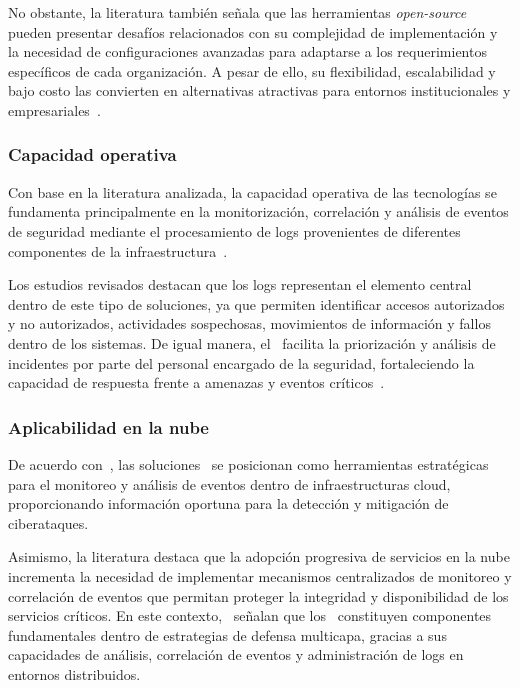 No obstante, la literatura también señala que las herramientas \SIEM \textit{open-source} pueden presentar desafíos relacionados con su 
complejidad de implementación y la necesidad de configuraciones avanzadas para adaptarse a los requerimientos específicos de cada 
organización. A pesar de ello, su flexibilidad, escalabilidad y bajo costo las convierten en alternativas atractivas para entornos 
institucionales y empresariales~\cite{hadi2024opensource}.

\subsubsection{Capacidad operativa}

Con base en la literatura analizada, la capacidad operativa de las tecnologías \SIEM se fundamenta principalmente en la monitorización, 
correlación y análisis de eventos de seguridad mediante el procesamiento de logs provenientes de diferentes componentes de la 
infraestructura~\cite{coppolino2022siem}.

Los estudios revisados destacan que los logs representan el elemento central dentro de este tipo de soluciones, ya que permiten 
identificar accesos autorizados y no autorizados, actividades sospechosas, movimientos de información y fallos dentro de los sistemas. De 
igual manera, el \SIEM\ facilita la priorización y análisis de incidentes por parte del personal encargado de la seguridad, fortaleciendo la 
capacidad de respuesta frente a amenazas y eventos críticos~\cite{coppolino2022siem}.

\subsubsection{Aplicabilidad en la nube}

De acuerdo con~\cite{coppolino2022siem}, las soluciones \SIEM\ se posicionan como herramientas estratégicas para el monitoreo y análisis de 
eventos dentro de infraestructuras cloud, proporcionando información oportuna para la detección y mitigación de ciberataques.

Asimismo, la literatura destaca que la adopción progresiva de servicios en la nube incrementa la necesidad de implementar mecanismos 
centralizados de monitoreo y correlación de eventos que permitan proteger la integridad y disponibilidad de los servicios críticos. En este 
contexto,~\cite{hadi2024opensource} señalan que los \SIEM\ constituyen componentes fundamentales dentro de estrategias de defensa multicapa, 
gracias a sus capacidades de análisis, correlación de eventos y administración de logs en entornos distribuidos.

